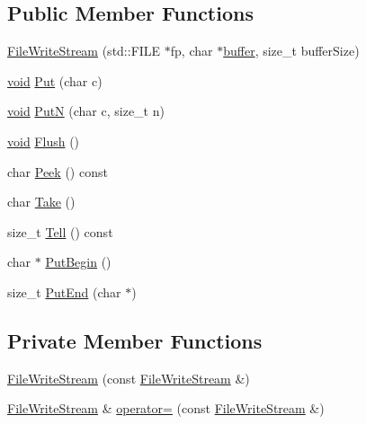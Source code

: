 \subsection*{Public Member Functions}
\begin{DoxyCompactItemize}
\item 
\hyperlink{classFileWriteStream_a553ea3e7377a7f7cace2daa3cc90e1a1}{File\+Write\+Stream} (std\+::\+F\+I\+LE $\ast$fp, char $\ast$\hyperlink{imgui__impl__opengl3__loader_8h_a3667f558219c90437106b544a3ca00b8}{buffer}, size\+\_\+t buffer\+Size)
\item 
\hyperlink{imgui__impl__opengl3__loader_8h_ac668e7cffd9e2e9cfee428b9b2f34fa7}{void} \hyperlink{classFileWriteStream_af6a6061d0accd939fa475b9b34427d85}{Put} (char c)
\item 
\hyperlink{imgui__impl__opengl3__loader_8h_ac668e7cffd9e2e9cfee428b9b2f34fa7}{void} \hyperlink{classFileWriteStream_ad9ec108b24316a2c1c83c6ddc75d308a}{PutN} (char c, size\+\_\+t n)
\item 
\hyperlink{imgui__impl__opengl3__loader_8h_ac668e7cffd9e2e9cfee428b9b2f34fa7}{void} \hyperlink{classFileWriteStream_a939fbf183ba36464c5e0837df4329d37}{Flush} ()
\item 
char \hyperlink{classFileWriteStream_ab556c7e26346ddff0e579a53c09c3a13}{Peek} () const
\item 
char \hyperlink{classFileWriteStream_ac927a0ae09a85eaba58a74ceb04b40ed}{Take} ()
\item 
size\+\_\+t \hyperlink{classFileWriteStream_a06272de32d6ac4d10c9bd5deb79a0234}{Tell} () const
\item 
char $\ast$ \hyperlink{classFileWriteStream_a4d1340a64fde3f16ac2afce19537c75e}{Put\+Begin} ()
\item 
size\+\_\+t \hyperlink{classFileWriteStream_a54b14047e4c998db0594290605f8f0dc}{Put\+End} (char $\ast$)
\end{DoxyCompactItemize}
\subsection*{Private Member Functions}
\begin{DoxyCompactItemize}
\item 
\hyperlink{classFileWriteStream_a62cc69f885b946b6bc2935f40c970cbb}{File\+Write\+Stream} (const \hyperlink{classFileWriteStream}{File\+Write\+Stream} \&)
\item 
\hyperlink{classFileWriteStream}{File\+Write\+Stream} \& \hyperlink{classFileWriteStream_a82e33badcc890b78ed482de7f1266f97}{operator=} (const \hyperlink{classFileWriteStream}{File\+Write\+Stream} \&)
\end{DoxyCompactItemize}
